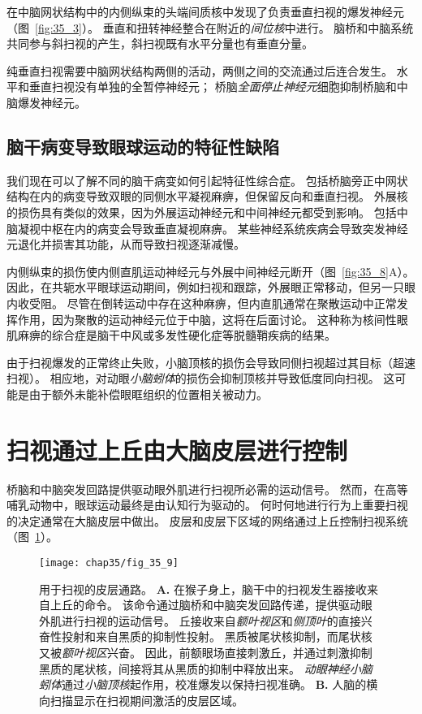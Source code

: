 在中脑网状结构中的内侧纵束的头端间质核中发现了负责垂直扫视的爆发神经元（图~\ref{fig:35_3}）。
垂直和扭转神经整合在附近的\textit{间位核}中进行。
脑桥和中脑系统共同参与斜扫视的产生，斜扫视既有水平分量也有垂直分量。


纯垂直扫视需要中脑网状结构两侧的活动，两侧之间的交流通过后连合发生。
水平和垂直扫视没有单独的全暂停神经元；
桥脑\textit{全面停止神经元}细胞抑制桥脑和中脑爆发神经元。



\subsection{脑干病变导致眼球运动的特征性缺陷}

我们现在可以了解不同的脑干病变如何引起特征性综合症。
包括桥脑旁正中网状结构在内的病变导致双眼的同侧水平凝视麻痹，但保留反向和垂直扫视。
外展核的损伤具有类似的效果，因为外展运动神经元和中间神经元都受到影响。
包括中脑凝视中枢在内的病变会导致垂直凝视麻痹。
某些神经系统疾病会导致突发神经元退化并损害其功能，从而导致扫视逐渐减慢。


内侧纵束的损伤使内侧直肌运动神经元与外展中间神经元断开（图~\ref{fig:35_8}A）。
因此，在共轭水平眼球运动期间，例如扫视和跟踪，外展眼正常移动，但另一只眼内收受阻。
尽管在倒转运动中存在这种麻痹，但内直肌通常在聚散运动中正常发挥作用，因为聚散的运动神经元位于中脑，这将在后面讨论。
这种称为核间性眼肌麻痹的综合症是脑干中风或多发性硬化症等脱髓鞘疾病的结果。


由于扫视爆发的正常终止失败，小脑顶核的损伤会导致同侧扫视超过其目标（超速扫视）。
相应地，对动眼\textit{小脑蚓体}的损伤会抑制顶核并导致低度同向扫视。
这可能是由于额外未能补偿眼眶组织的位置相关被动力。



\section{扫视通过上丘由大脑皮层进行控制}

桥脑和中脑突发回路提供驱动眼外肌进行扫视所必需的运动信号。
然而，在高等哺乳动物中，眼球运动最终是由认知行为驱动的。
何时何地进行行为上重要扫视的决定通常在大脑皮层中做出。
皮层和皮层下区域的网络通过上丘控制扫视系统（图~\ref{fig:35_9}）。


\begin{figure}[htbp]
	\centering
	\texttt{[image: chap35/fig\_35\_9]}
	\caption{用于扫视的皮层通路。
		\textbf{A.} 在猴子身上，脑干中的扫视发生器接收来自上丘的命令。
		该命令通过脑桥和中脑突发回路传递，提供驱动眼外肌进行扫视的运动信号。
		丘接收来自\textit{额叶视区}和\textit{侧顶叶}的直接兴奋性投射和来自黑质的抑制性投射。
		黑质被尾状核抑制，而尾状核又被\textit{额叶视区}兴奋。
		因此，前额眼场直接刺激丘，并通过刺激抑制黑质的尾状核，间接将其从黑质的抑制中释放出来。
		\textit{动眼神经小脑蚓体}通过\textit{小脑顶核}起作用，校准爆发以保持扫视准确。
		\textbf{B.} 人脑的横向扫描显示在扫视期间激活的皮层区域\cite{curtis2008saccade}。}
	\label{fig:35_9}
\end{figure}



